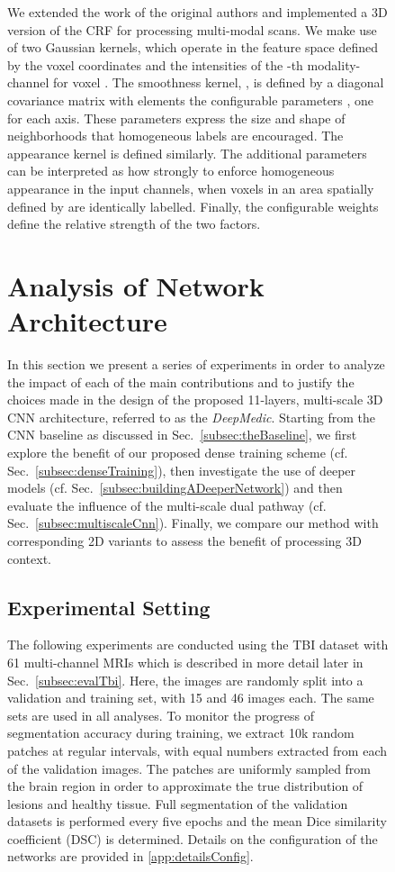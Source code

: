\documentclass[preprint,authoryear,12pt]{elsarticle}
\begin{document}
\begin{figure}[h]
We extended the work of the original authors and implemented a 3D version of the CRF for processing multi-modal scans. We make use of two Gaussian kernels, which operate in the feature space defined by the voxel coordinates  and the intensities of the -th modality-channel  for voxel . The smoothness kernel, , is defined by a diagonal covariance matrix with elements the configurable parameters , one for each axis. These parameters express the size and shape of neighborhoods that homogeneous labels are encouraged. The appearance kernel  is defined similarly. The additional parameters  can be interpreted as how strongly to enforce homogeneous appearance in the  input channels, when voxels in an area spatially defined by  are identically labelled. Finally, the configurable weights  define the relative strength of the two factors.

 





\section{Analysis of Network Architecture}
\label{sec:vaOfNetArch}

In this section we present a series of experiments in order to analyze the impact of each of the main contributions and to justify the choices made in the design of the proposed 11-layers, multi-scale 3D CNN architecture, referred to as the \textit{DeepMedic}. Starting from the CNN baseline as discussed in Sec.~\ref{subsec:theBaseline}, we first explore the benefit of our proposed dense training scheme (cf. Sec.~\ref{subsec:denseTraining}), then investigate the use of deeper models (cf. Sec.~\ref{subsec:buildingADeeperNetwork}) and then evaluate the influence of the multi-scale dual pathway (cf. Sec.~\ref{subsec:multiscaleCnn}). Finally, we compare our method with corresponding 2D variants to assess the benefit of processing 3D context.

\subsection{Experimental Setting}
\label{subsec:experimentSetting}

The following experiments are conducted using the TBI dataset with 61 multi-channel MRIs which is described in more detail later in Sec.~\ref{subsec:evalTbi}. Here, the images are randomly split into a validation and training set, with 15 and 46 images each. The same sets are used in all analyses. To monitor the progress of segmentation accuracy during training, we extract 10k random patches at regular intervals, with equal numbers extracted from each of the validation images. The patches are uniformly sampled from the brain region in order to approximate the true distribution of lesions and healthy tissue. Full segmentation of the validation datasets is performed every five epochs and the mean Dice similarity coefficient (DSC) is determined. Details on the configuration of the networks are provided in \ref{app:detailsConfig}.


\end{figure}
\end{document}
